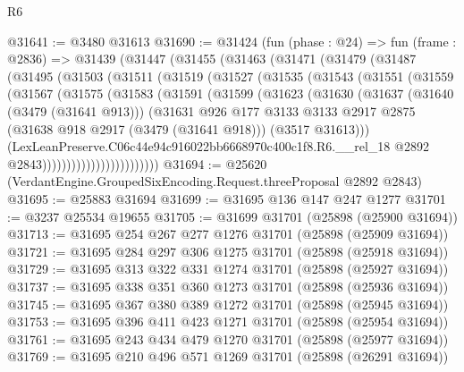 \begin{lexlean}{R6}
\begin{coremodule}
@31641 := @3480 @31613
@31690 := @31424
    (fun (phase : @24) =>
    fun (frame : @2836) =>
    @31439
      (@31447
        (@31455
          (@31463
            (@31471
              (@31479
                (@31487
                  (@31495
                    (@31503
                      (@31511
                        (@31519
                          (@31527
                            (@31535
                              (@31543
                                (@31551
                                  (@31559
                                    (@31567
                                      (@31575
                                        (@31583
                                          (@31591
                                            (@31599
                                              (@31623
                                                (@31630
                                                  (@31637
                                                    (@31640 (@3479 (@31641 @913)))
                                                    (@31631
                                                      @926
                                                      @177
                                                      @3133
                                                      @3133
                                                      @2917
                                                      @2875
                                                      (@31638 @918 @2917 (@3479 (@31641 @918)))
                                                      (@3517 @31613)))
                                                  (LexLeanPreserve.C06c44e94c916022bb6668970c400c1f8.R6.__rel_18
                                                    @2892
                                                    @2843))))))))))))))))))))))))
@31694 := @25620 (VerdantEngine.GroupedSixEncoding.Request.threeProposal @2892 @2843)
@31695 := @25883 @31694
@31699 := @31695 @136 @147 @247 @1277
@31701 := @3237 @25534 @19655
@31705 := @31699 @31701 (@25898 (@25900 @31694))
@31713 := @31695 @254 @267 @277 @1276 @31701 (@25898 (@25909 @31694))
@31721 := @31695 @284 @297 @306 @1275 @31701 (@25898 (@25918 @31694))
@31729 := @31695 @313 @322 @331 @1274 @31701 (@25898 (@25927 @31694))
@31737 := @31695 @338 @351 @360 @1273 @31701 (@25898 (@25936 @31694))
@31745 := @31695 @367 @380 @389 @1272 @31701 (@25898 (@25945 @31694))
@31753 := @31695 @396 @411 @423 @1271 @31701 (@25898 (@25954 @31694))
@31761 := @31695 @243 @434 @479 @1270 @31701 (@25898 (@25977 @31694))
@31769 := @31695 @210 @496 @571 @1269 @31701 (@25898 (@26291 @31694))

\end{coremodule}
\end{lexlean}
